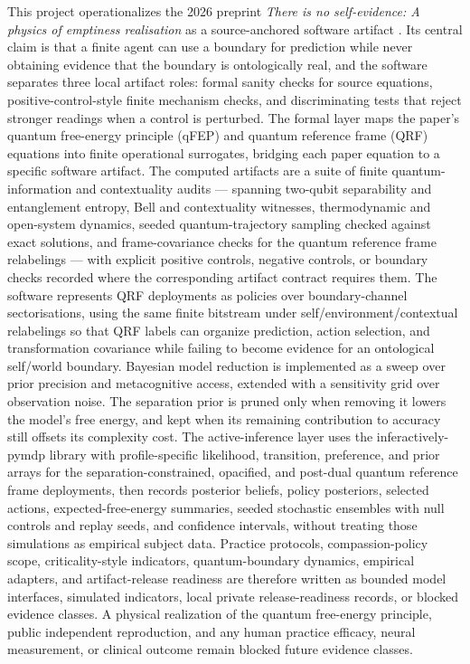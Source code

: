 \documentclass[
]{article}
\begin{document}
This project operationalizes the 2026 preprint \emph{There is no
self-evidence: A physics of emptiness realisation} as a source-anchored
software artifact \citep{sandvedsmith2026noself}. Its central claim is
that a finite agent can use a boundary for prediction while never
obtaining evidence that the boundary is ontologically real, and the
software separates three local artifact roles: formal sanity checks for
source equations, positive-control-style finite mechanism checks, and
discriminating tests that reject stronger readings when a control is
perturbed. The formal layer maps the paper's quantum free-energy
principle (qFEP) and quantum reference frame (QRF) equations into finite
operational surrogates, bridging each paper equation to a specific
software artifact. The computed artifacts are a suite of finite
quantum-information and contextuality audits --- spanning two-qubit
separability and entanglement entropy, Bell and contextuality witnesses,
thermodynamic and open-system dynamics, seeded quantum-trajectory
sampling checked against exact solutions, and frame-covariance checks
for the quantum reference frame relabelings --- with explicit positive
controls, negative controls, or boundary checks recorded where the
corresponding artifact contract requires them. The software represents
QRF deployments as policies over boundary-channel sectorisations, using
the same finite bitstream under self/environment/contextual relabelings
so that QRF labels can organize prediction, action selection, and
transformation covariance while failing to become evidence for an
ontological self/world boundary. Bayesian model reduction is implemented
as a sweep over prior precision and metacognitive access, extended with
a sensitivity grid over observation noise. The separation prior is
pruned only when removing it lowers the model's free energy, and kept
when its remaining contribution to accuracy still offsets its complexity
cost. The active-inference layer uses the inferactively-pymdp library
\citep{heins2022pymdp} with profile-specific likelihood, transition,
preference, and prior arrays for the separation-constrained, opacified,
and post-dual quantum reference frame deployments, then records
posterior beliefs, policy posteriors, selected actions,
expected-free-energy summaries, seeded stochastic ensembles with null
controls and replay seeds, and confidence intervals, without treating
those simulations as empirical subject data. Practice protocols,
compassion-policy scope, criticality-style indicators, quantum-boundary
dynamics, empirical adapters, and artifact-release readiness are
therefore written as bounded model interfaces, simulated indicators,
local private release-readiness records, or blocked evidence classes. A
physical realization of the quantum free-energy principle, public
independent reproduction, and any human practice efficacy, neural
measurement, or clinical outcome remain blocked future evidence classes.
\end{document}
